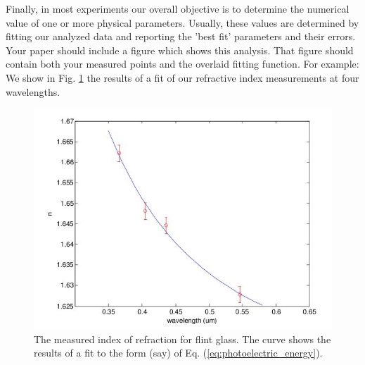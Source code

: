 Finally, in most experiments our overall objective is to determine the numerical value of one or more physical parameters. Usually, these values are determined by fitting our analyzed data and reporting the 'best fit' parameters and their errors. Your paper should include a figure which shows this analysis. That figure should contain both your measured points and the overlaid fitting function. For example: We show in Fig. \ref{fig:index_refraction} the results of a fit of our refractive index measurements at four wavelengths.
\begin{figure}[h]
    \centering
    \includegraphics[width=0.9\linewidth]{figures/index_refraction.png}
    \caption{\small The measured index of refraction for flint glass. The curve shows the results of a fit to the form (say) of Eq. (\ref{eq:photoelectric_energy}).\cite{Kov_22}}
    \label{fig:index_refraction}
\end{figure}